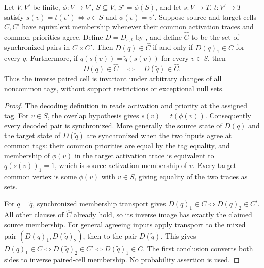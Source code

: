 \begin{lemma}
Let $V,V'$ be finite, $\phi:V\to V'$, $S\subseteq V$, $S'=\phi(S)$,
and let $s:V\to T$, $t:V'\to T$ satisfy
$s(v)=t(v')\iff v\in S\text{ and }\phi(v)=v'$.
Suppose source and target cells $C,C'$ have equivalent membership whenever
their common activation traces and common priorities agree. Define $D=D_{s,t}$
by , and define
$\widehat C$ to be the set of synchronized pairs in $C\times C'$.
Then $D(q)\in\widehat C$ if and only if $D(q)_1\in C$ for every $q$.
Furthermore, if $q(s(v))=\widetilde q(s(v))$ for every $v\in S$, then
\[
D(q)\in\widehat C\quad\Longleftrightarrow\quad
D(\widetilde q)\in\widehat C.
\]
Thus the inverse paired cell is invariant under arbitrary changes of all
noncommon tags, without support restrictions or exceptional null sets.
\end{lemma}
\begin{proof}
The decoding definition in
 reads activation and
priority at the assigned tag. For $v\in S$, the overlap hypothesis gives
$s(v)=t(\phi(v))$. Consequently every decoded pair is synchronized. More
generally the source state of $D(q)$ and the target state of
$D(\widetilde q)$ are synchronized when the two inputs agree at common tags:
their common priorities are equal by the tag equality, and membership of
$\phi(v)$ in the target activation trace is equivalent to
$q(s(v))_1=1$, which is source activation membership of $v$.
Every target common vertex is some $\phi(v)$ with $v\in S$, giving equality
of the two traces as sets.

For $q=\widetilde q$, synchronized membership transport gives
$D(q)_1\in C\iff D(q)_2\in C'$. All other clauses of $\widehat C$ already
hold, so its inverse image has exactly the claimed source membership.
For general agreeing inputs apply transport to the mixed pair
$(D(q)_1,D(\widetilde q)_2)$, then to the pair $D(\widetilde q)$.
This gives $D(q)_1\in C\iff D(\widetilde q)_2\in C'
\iff D(\widetilde q)_1\in C$. The first conclusion converts both sides
to inverse paired-cell membership. No probability assertion is used.
\end{proof}
